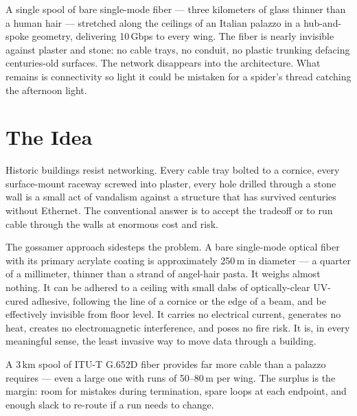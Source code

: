 \documentclass[]{anvil-proposal}
\begin{document}
\maketitleblock

\herofigure{}

\begin{callout}[title=Premise]
A single spool of bare single-mode fiber --- three kilometers of glass thinner than a human hair --- stretched along the ceilings of an Italian palazzo in a hub-and-spoke geometry, delivering 10\,Gbps to every wing. The fiber is nearly invisible against plaster and stone: no cable trays, no conduit, no plastic trunking defacing centuries-old surfaces. The network disappears into the architecture. What remains is connectivity so light it could be mistaken for a spider's thread catching the afternoon light.
\end{callout}

\section{The Idea}

Historic buildings resist networking. Every cable tray bolted to a cornice, every surface-mount raceway screwed into plaster, every hole drilled through a stone wall is a small act of vandalism against a structure that has survived centuries without Ethernet. The conventional answer is to accept the tradeoff or to run cable through the walls at enormous cost and risk.

The gossamer approach sidesteps the problem. A bare single-mode optical fiber with its primary acrylate coating is approximately 250\,\textmu m in diameter --- a quarter of a millimeter, thinner than a strand of angel-hair pasta. It weighs almost nothing. It can be adhered to a ceiling with small dabs of optically-clear UV-cured adhesive, following the line of a cornice or the edge of a beam, and be effectively invisible from floor level. It carries no electrical current, generates no heat, creates no electromagnetic interference, and poses no fire risk. It is, in every meaningful sense, the least invasive way to move data through a building.

A 3\,km spool of ITU-T G.652D fiber provides far more cable than a palazzo requires --- even a large one with runs of 50--80\,m per wing. The surplus is the margin: room for mistakes during termination, spare loops at each endpoint, and enough slack to re-route if a run needs to change.
\end{document}

